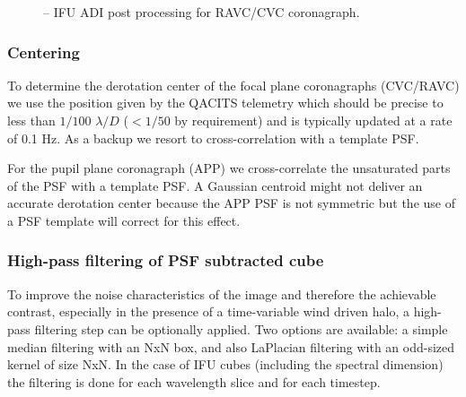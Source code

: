 \begin{figure}[hb]
  \centering
  \def \globalscale {0.400000}
  \fontsize{10}{12}\selectfont
  
  \caption[Recipe: ]{ -- IFU ADI post processing for RAVC/CVC coronagraph.
    }
  \label{fig:metis_ifu_adi_cgrph}
\end{figure}
\restoregeometry

\subsubsection{Centering}
\label{adi_center}
To determine the derotation center of the focal plane coronagraphs (CVC/RAVC) we use the position given by the QACITS telemetry which should be precise to less than $1/100$ $\lambda/D$ ($<1/50$ by requirement) and is typically updated at a rate of 0.1 Hz. As a backup we resort to cross-correlation with a template PSF.

For the pupil plane coronagraph (APP) we cross-correlate the unsaturated parts of the PSF with a template PSF. A Gaussian centroid might not deliver an accurate derotation center because the APP PSF is not symmetric but the use of a PSF template will correct for this effect.

\subsubsection{High-pass filtering of PSF subtracted cube}

To improve the noise characteristics of the image and therefore the achievable contrast, especially in the presence of a time-variable wind driven halo, a high-pass filtering step can be optionally applied. Two options are available: a simple median filtering with an NxN box, and also LaPlacian filtering with an odd-sized kernel of size NxN. In the case of IFU cubes (including the spectral dimension) the filtering is done for each wavelength slice and for each timestep.

